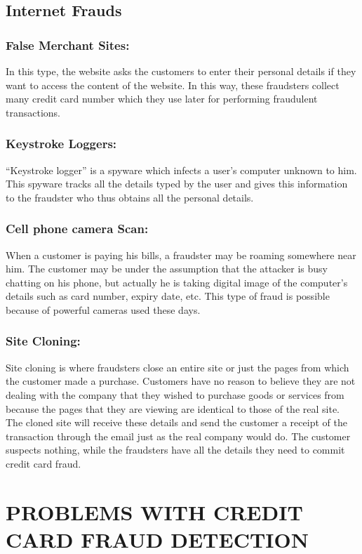 \documentclass{report}
\begin{document}
\section{Internet Frauds}
\subsection{False Merchant Sites:}
 In this type, the website asks the customers to enter their personal details if they want to access the content of the website. In this way, these fraudsters collect many credit card number which they use later for performing fraudulent transactions.

\subsection{Keystroke Loggers:}
“Keystroke logger” is a spyware which infects a user’s computer unknown to him. This spyware tracks all the details typed by the user and gives this information to the fraudster who thus obtains all the personal details.

\subsection{Cell phone camera Scan:}
When a customer is paying his bills, a fraudster may be roaming somewhere near him. The customer may be under the assumption that the attacker is busy chatting on his phone, but actually he is taking digital image of the computer’s details such as card number, expiry date, etc. This type of fraud is possible because of powerful cameras used these days. 

\subsection{Site Cloning:}
Site cloning is where fraudsters close an entire site or just the pages from which the customer made a purchase. Customers have no reason to believe they are not dealing with the company that they wished to purchase goods or services from because the pages that they are viewing are identical to those of the real site. The cloned site will receive these details and send the customer a receipt of the transaction through the email just as the real company would do. The customer suspects nothing, while the fraudsters have all the details they need to commit credit card fraud.

\chapter{PROBLEMS WITH CREDIT CARD FRAUD DETECTION}
\end{document}
